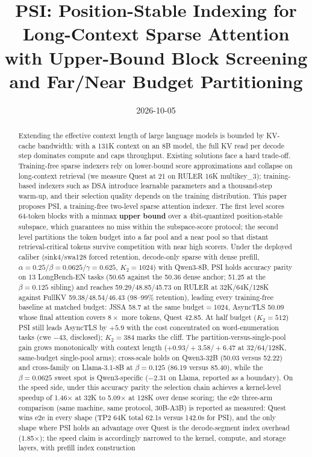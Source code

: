 \documentclass[11pt]{article}
\title{PSI: Position-Stable Indexing for Long-Context Sparse Attention\\
\large with Upper-Bound Block Screening and Far/Near Budget Partitioning}
\date{2026-10-05}
\begin{document}
\maketitle

\begin{abstract}
Extending the effective context length of large language models is bounded by KV-cache bandwidth: with a 131K context on an 8B model, the full KV read per decode step dominates compute and caps throughput. Existing solutions face a hard trade-off. Training-free sparse indexers rely on lower-bound score approximations and collapse on long-context retrieval (we measure Quest at 21 on RULER 16K multikey\_3); training-based indexers such as DSA introduce learnable parameters and a thousand-step warm-up, and their selection quality depends on the training distribution. This paper proposes PSI, a training-free two-level sparse attention indexer. The first level scores 64-token blocks with a minmax \textbf{upper bound} over a 4bit-quantized position-stable subspace, which guarantees no miss within the subspace-score protocol; the second level partitions the token budget into a far pool and a near pool so that distant retrieval-critical tokens survive competition with near high scorers. Under the deployed caliber (sink4/swa128 forced retention, decode-only sparse with dense prefill, $\alpha{=}0.25/\beta{=}0.0625/\gamma{=}0.625$, $K_2{=}1024$) with Qwen3-8B, PSI holds accuracy parity on 13 LongBench-EN tasks (50.65 against the 50.36 dense anchor; 51.25 at the $\beta{=}0.125$ sibling) and reaches 59.29/48.85/45.73 on RULER at 32K/64K/128K against FullKV 59.38/48.54/46.43 (98--99\% retention), leading every training-free baseline at matched budget: JSSA 58.7 at the same budget$=$1024, AsyncTLS 50.09 whose final attention covers $8\times$ more tokens, Quest 42.85. At half budget ($K_2{=}512$) PSI still leads AsyncTLS by $+5.9$ with the cost concentrated on word-enumeration tasks (cwe $-43$, disclosed); $K_2{=}384$ marks the cliff. The partition-versus-single-pool gain grows monotonically with context length ($+0.93/+3.58/+6.47$ at 32/64/128K, same-budget single-pool arms); cross-scale holds on Qwen3-32B (50.03 versus 52.22) and cross-family on Llama-3.1-8B at $\beta{=}0.125$ (86.19 versus 85.40), while the $\beta{=}0.0625$ sweet spot is Qwen3-specific ($-2.31$ on Llama, reported as a boundary). On the speed side, under this accuracy parity the selection chain achieves a kernel-level speedup of 1.46$\times$ at 32K to 5.09$\times$ at 128K over dense scoring; the e2e three-arm comparison (same machine, same protocol, 30B-A3B) is reported as measured: Quest wins e2e in every shape (TP2 64K total 62.1s versus 142.0s for PSI), and the only shape where PSI holds an advantage over Quest is the decode-segment index overhead (1.85$\times$); the speed claim is accordingly narrowed to the kernel, compute, and storage layers, with prefill index construction 
\end{abstract}
\end{document}
